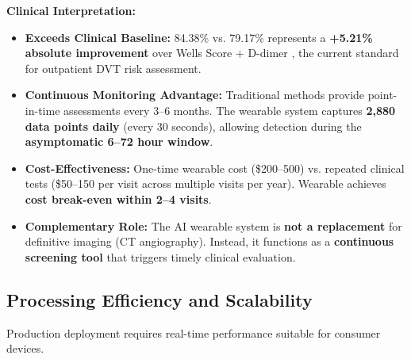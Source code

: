 \documentclass[3p,times,procedia]{elsarticle}
\begin{document}
\textbf{Clinical Interpretation:}
\begin{itemize}
    \item \textbf{Exceeds Clinical Baseline:} 84.38\% vs. 79.17\% represents a \textbf{+5.21\% absolute improvement} over Wells Score + D-dimer \cite{wells1997value}, the current standard for outpatient DVT risk assessment.

    \item \textbf{Continuous Monitoring Advantage:} Traditional methods provide point-in-time assessments every 3--6 months. The wearable system captures \textbf{2,880 data points daily} (every 30 seconds), allowing detection during the \textbf{asymptomatic 6--72 hour window}.

    \item \textbf{Cost-Effectiveness:} One-time wearable cost (\$200--500) vs. repeated clinical tests (\$50--150 per visit across multiple visits per year). Wearable achieves \textbf{cost break-even within 2--4 visits}.

    \item \textbf{Complementary Role:} The AI wearable system is \textbf{not a replacement} for definitive imaging (CT angiography). Instead, it functions as a \textbf{continuous screening tool} that triggers timely clinical evaluation.
\end{itemize}

\vspace{10pt}

\subsection{Processing Efficiency and Scalability}
Production deployment requires real-time performance suitable for consumer devices.

\FloatBarrier
\vspace{10pt}
\end{document}
